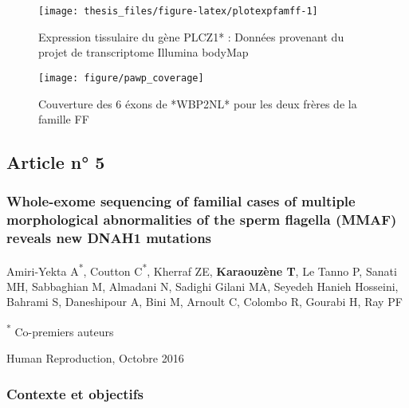 \documentclass[12pt,twoside]{reedthesis}
\theoremstyle{definition}
\theoremstyle{definition}
\theoremstyle{remark}
\begin{document}
  \newpage
  
  \begin{figure}
  
  {\centering \texttt{[image: thesis\_files/figure-latex/plotexpfamff-1]} 
  
  }
  
  \caption[Expression tissulaire du gène PLCZ1*]{Expression tissulaire du gène PLCZ1* : Données provenant du projet de transcriptome Illumina bodyMap}\label{fig:plotexpfamff}
  \end{figure}
  
  \begin{figure}
  
  {\centering \texttt{[image: figure/pawp\_coverage]} 
  
  }
  
  \caption[Couverture des 6 éxons de *WBP2NL* pour les deux frères de la famille FF]{Couverture des 6 éxons de *WBP2NL* pour les deux frères de la famille FF}\label{fig:plotcovplcz}
  \end{figure}
  
  \newpage
  
  \subsection{Article n° 5}\label{article-n-5}
  
  \subsubsection{Whole-exome sequencing of familial cases of multiple
  morphological abnormalities of the sperm flagella (MMAF) reveals new
  DNAH1
  mutations}\label{whole-exome-sequencing-of-familial-cases-of-multiple-morphological-abnormalities-of-the-sperm-flagella-mmaf-reveals-new-dnah1-mutations}
  
  Amiri-Yekta A\textsuperscript{*}, Coutton C\textsuperscript{*}, Kherraf
  ZE, \textbf{Karaouzène T}, Le Tanno P, Sanati MH, Sabbaghian M, Almadani
  N, Sadighi Gilani MA, Seyedeh Hanieh Hosseini, Bahrami S, Daneshipour A,
  Bini M, Arnoult C, Colombo R, Gourabi H, Ray PF
  
  \textsuperscript{*} Co-premiers auteurs
  
  Human Reproduction, Octobre 2016
  
  \newpage
  
  \subsubsection{Contexte et objectifs}\label{contexte-et-objectifs-2}
  
\end{document}
